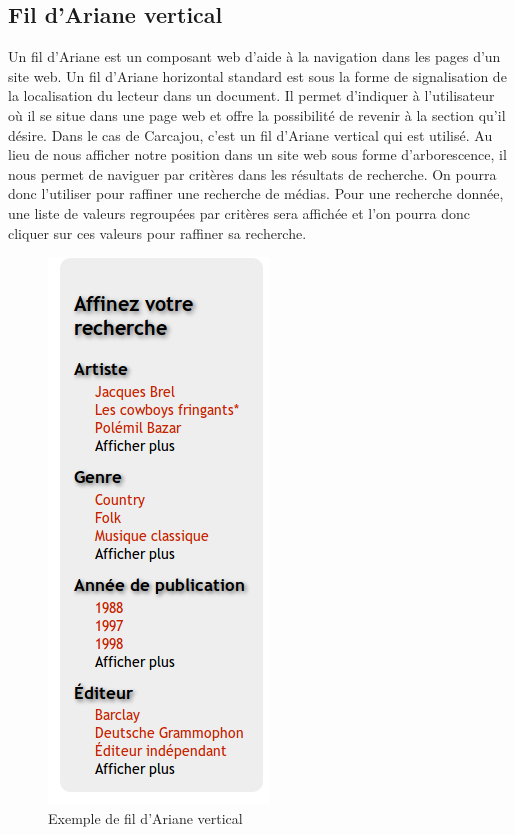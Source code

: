 \documentclass[letter, 11pt]{report}
\begin{document}
\subsection{Fil d'Ariane vertical}
Un fil d'Ariane est un composant web d'aide à la navigation dans les pages d'un site web. Un fil d'Ariane horizontal standard est sous la forme de signalisation de la localisation du lecteur dans un document. Il permet d'indiquer à l'utilisateur où il se situe dans une page web et offre la possibilité de revenir à la section qu'il désire.  Dans le cas de Carcajou, c'est un fil d'Ariane vertical qui est utilisé. Au lieu de nous afficher notre position dans un site web sous forme d'arborescence, il nous permet de naviguer par critères dans les résultats de recherche. On pourra donc l'utiliser pour raffiner une recherche de médias. Pour une recherche donnée, une liste de valeurs regroupées par critères sera affichée et l'on pourra donc cliquer sur ces valeurs pour raffiner sa recherche. 

\begin{figure}[htbp]
	\begin{center}
		\includegraphics[scale=0.5]{captures_ecran/exemple_fil_darianne.png}
	\end{center}
	\caption{Exemple de fil d'Ariane vertical}
\end{figure}
\end{document}
